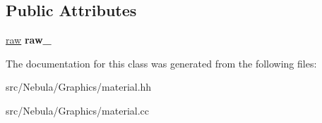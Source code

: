 \subsection*{\-Public \-Attributes}
\begin{DoxyCompactItemize}
\item 
\hypertarget{classNeb_1_1material_1_1material_aba15a8b4c829ec39dfb71ccfcc1ad1f6}{\hyperlink{structNeb_1_1material_1_1raw}{raw} {\bfseries raw\-\_\-}}\label{classNeb_1_1material_1_1material_aba15a8b4c829ec39dfb71ccfcc1ad1f6}

\end{DoxyCompactItemize}


\-The documentation for this class was generated from the following files\-:\begin{DoxyCompactItemize}
\item 
src/\-Nebula/\-Graphics/material.\-hh\item 
src/\-Nebula/\-Graphics/material.\-cc\end{DoxyCompactItemize}
